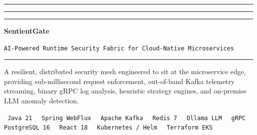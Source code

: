\documentclass[12pt, a4paper]{article}
\begin{document}
\begin{titlepage}
    \thispagestyle{empty}
    \centering
    \vspace*{1.5cm}

    \textcolor{accentteal}{\rule{0.15\linewidth}{3pt}}
    \textcolor{bordercolor}{\rule{0.7\linewidth}{1pt}}
    \textcolor{accentteal}{\rule{0.15\linewidth}{3pt}}

    \vspace{1.2cm}

    {\fontsize{36}{44}\selectfont\bfseries\color{darkgray} SentientGate\par}
    \vspace{0.3cm}
    {\large\color{accentteal}\texttt{AI-Powered Runtime Security Fabric for Cloud-Native Microservices}\par}

    \vspace{0.8cm}
    \textcolor{bordercolor}{\rule{0.6\linewidth}{0.5pt}}
    \vspace{0.8cm}

    \begin{minipage}{0.88\linewidth}
        \centering
        {\normalsize\color{midgray}
        A resilient, distributed security mesh engineered to sit at the microservice edge,
        providing sub-millisecond request enforcement, out-of-band Kafka telemetry streaming,
        binary gRPC log analysis, heuristic strategy engines, and on-premise LLM anomaly detection.
        \par}
    \end{minipage}

    \vspace{1.2cm}

    \begin{center}
        \colorbox{accentblue!15}{\small\color{accentblue}\texttt{ Java 21 }}
        \colorbox{accentteal!15}{\small\color{accentteal}\texttt{ Spring WebFlux }}
        \colorbox{accentamber!15}{\small\color{accentamber}\texttt{ Apache Kafka }}
        \colorbox{accentred!10}{\small\color{accentred}\texttt{ Redis 7 }}
        \colorbox{accentpurple!15}{\small\color{accentpurple}\texttt{ Ollama LLM }}
        \colorbox{darkgray!10}{\small\color{darkgray}\texttt{ gRPC }}
        \colorbox{lowgreen!15}{\small\color{lowgreen}\texttt{ PostgreSQL 16 }}
        \colorbox{accentblue!15}{\small\color{accentblue}\texttt{ React 18 }}
        \colorbox{accentteal!15}{\small\color{accentteal}\texttt{ Kubernetes / Helm }}
        \colorbox{accentamber!15}{\small\color{accentamber}\texttt{ Terraform EKS }}
    \end{center}


\end{titlepage}
\end{document}
